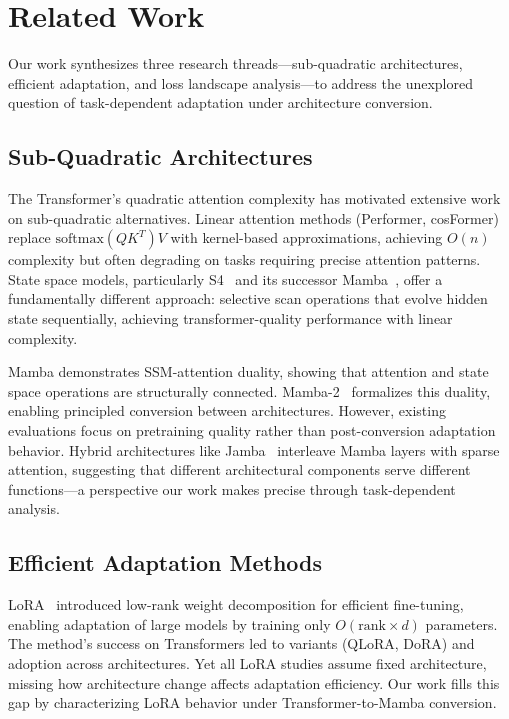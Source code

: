 \section{Related Work}

Our work synthesizes three research threads---sub-quadratic architectures, efficient adaptation, and loss landscape analysis---to address the unexplored question of task-dependent adaptation under architecture conversion.

\subsection{Sub-Quadratic Architectures}

The Transformer's quadratic attention complexity has motivated extensive work on sub-quadratic alternatives. Linear attention methods (Performer, cosFormer) replace $\text{softmax}(QK^T)V$ with kernel-based approximations, achieving $O(n)$ complexity but often degrading on tasks requiring precise attention patterns. State space models, particularly S4~\cite{gu2022s4} and its successor Mamba~\cite{gu2023mamba}, offer a fundamentally different approach: selective scan operations that evolve hidden state sequentially, achieving transformer-quality performance with linear complexity.

Mamba demonstrates SSM-attention duality, showing that attention and state space operations are structurally connected. Mamba-2~\cite{dao2024mamba2} formalizes this duality, enabling principled conversion between architectures. However, existing evaluations focus on pretraining quality rather than post-conversion adaptation behavior. Hybrid architectures like Jamba~\cite{jamba2024} interleave Mamba layers with sparse attention, suggesting that different architectural components serve different functions---a perspective our work makes precise through task-dependent analysis.

\subsection{Efficient Adaptation Methods}

LoRA~\cite{hu2021lora} introduced low-rank weight decomposition for efficient fine-tuning, enabling adaptation of large models by training only $O(\text{rank} \times d)$ parameters. The method's success on Transformers led to variants (QLoRA, DoRA) and adoption across architectures. Yet all LoRA studies assume fixed architecture, missing how architecture change affects adaptation efficiency. Our work fills this gap by characterizing LoRA behavior under Transformer-to-Mamba conversion.


